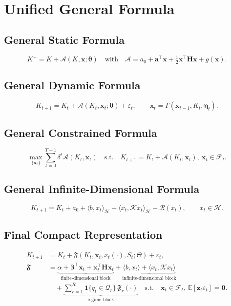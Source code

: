 \documentclass[11pt]{article}
\begin{document}
\section{Unified General Formula}

\subsection{General Static Formula}
\[
K^+=K+\mathcal{A}(K,\bm{x};\bm{\theta})
\quad\text{with}\quad
\mathcal{A}=a_0+\bm{a}^\top\bm{x}+\tfrac12\bm{x}^\top\bm{H}\bm{x}+g(\bm{x}).
\]

\subsection{General Dynamic Formula}
\[
K_{t+1}=K_t+\mathcal{A}(K_t,\bm{x}_t;\bm{\theta})+\varepsilon_t,
\qquad \bm{x}_t=\Gamma(\bm{x}_{t-1},K_t,\bm{\eta}_t).
\]

\subsection{General Constrained Formula}
\[
\max_{\{\bm{x}_t\}}\sum_{t=0}^{T-1}\delta^t\mathcal{A}(K_t,\bm{x}_t)
\quad\text{s.t.}\quad K_{t+1}=K_t+\mathcal{A}(K_t,\bm{x}_t),\ \bm{x}_t\in\mathcal{F}_t.
\]

\subsection{General Infinite-Dimensional Formula}
\[
K_{t+1}=K_t+a_0+\langle b,x_t\rangle_{\mathcal{H}}+\langle x_t,\mathcal{K}x_t\rangle_{\mathcal{H}}+\mathcal{R}(x_t),
\qquad x_t\in\mathcal{H}.
\]

\subsection{Final Compact Representation}
\[
\boxed{
\begin{aligned}
K_{t+1}
&=K_t+\mathfrak{F}\!\left(K_t,\bm{x}_t,x_t(\cdot),S_t;\Theta\right)+\varepsilon_t,\\
\mathfrak{F}
&=\underbrace{\alpha+\bm{\beta}^\top\bm{x}_t+\bm{x}_t^\top\bm{H}\bm{x}_t}_{\text{finite-dimensional block}}
+\underbrace{\langle b,x_t\rangle+\langle x_t,\mathcal{K}x_t\rangle}_{\text{infinite-dimensional block}}\\
&\quad+\underbrace{\sum_{r=1}^R\mathbf{1}\{q_t\in\mathcal{Q}_r\}\,\mathfrak{F}_r(\cdot)}_{\text{regime block}}
\quad\text{s.t.}\quad \bm{x}_t\in\mathcal{F}_t,\ \mathbb{E}[\bm{z}_t\varepsilon_t]=\bm{0}.
\end{aligned}}
\]
\end{document}
